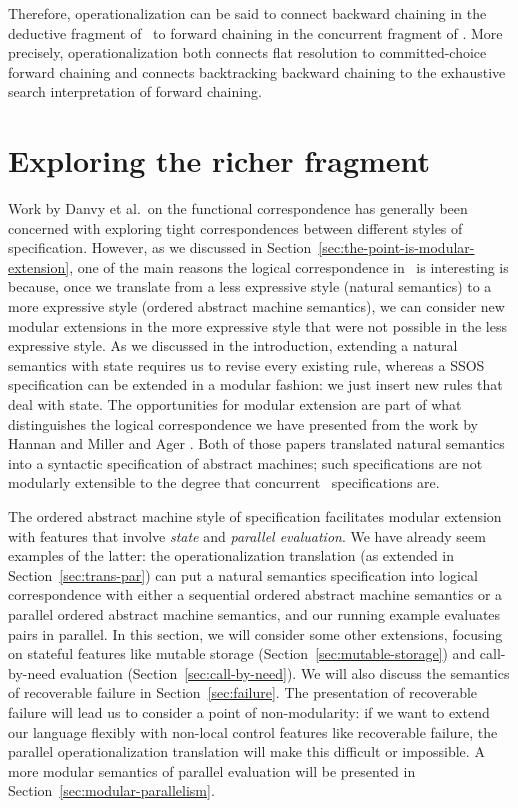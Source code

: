 Therefore, operationalization can be said to connect backward
chaining in the deductive fragment of \sls~to forward chaining in the
concurrent fragment of \sls. More precisely, operationalization both
connects flat resolution to committed-choice forward chaining and
connects backtracking backward chaining to the exhaustive search
interpretation of forward chaining.

\section{Exploring the richer fragment}
\label{sec:richer-ordered-abstract}

Work by Danvy et al.~on the functional correspondence has generally
been concerned with exploring tight correspondences between different
styles of specification. However, as we discussed in
Section~\ref{sec:the-point-is-modular-extension}, one of the main
reasons the logical correspondence in \sls~is interesting is because,
once we translate from a less expressive style (natural semantics) to
a more expressive style (ordered abstract machine semantics), we can
consider new modular extensions in the more expressive style that were
not possible in the less expressive style. As we discussed in the
introduction, extending a natural semantics with state requires us to
revise every existing rule, whereas a SSOS specification can be
extended in a modular fashion: we just insert new rules
that deal with state. The
opportunities for modular extension are part of what distinguishes the
logical correspondence we have presented from the work by Hannan and
Miller \cite{hannan92operational} and Ager \cite{ager04natural}. Both
of those papers translated natural semantics into a syntactic
specification of abstract machines; such specifications are not
modularly extensible to the degree that concurrent \sls~specifications
are.

The ordered abstract machine style of specification facilitates
modular extension with features that involve {\it state} and {\it
  parallel evaluation}. We have already seem examples of the latter:
the operationalization translation (as extended in
Section~\ref{sec:trans-par}) can put a natural semantics specification
into logical correspondence with either a sequential ordered abstract
machine semantics or a parallel ordered abstract machine semantics,
and our running example evaluates pairs in parallel. In this section,
we will consider some other extensions, focusing on stateful features
like mutable storage (Section~\ref{sec:mutable-storage}) and
call-by-need evaluation (Section~\ref{sec:call-by-need}). We will also
discuss the semantics of recoverable failure in
Section~\ref{sec:failure}. The presentation of recoverable failure
will lead us to consider a point of non-modularity: if we want to
extend our language flexibly with non-local control features like
recoverable failure, the parallel operationalization translation will
make this difficult or impossible.  A more modular semantics of
parallel evaluation will be presented in
Section~\ref{sec:modular-parallelism}. 

